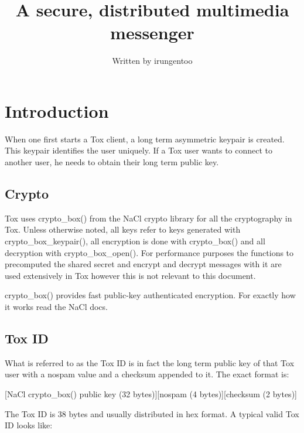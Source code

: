 \documentclass{tox}
\begin{document}
\title{A secure, distributed multimedia messenger}


\author{Written by irungentoo} %

\maketitle

\section{Introduction}

When one first starts a Tox client, a long term asymmetric keypair is created. 
This keypair identifies the user uniquely. If a Tox user wants to connect to 
another user, he needs to obtain their long term public key. 

\subsection{Crypto}

Tox uses crypto\_box() from the NaCl crypto library for all the cryptography in 
Tox. Unless otherwise noted, all keys refer to keys generated with 
crypto\_box\_keypair(), all encryption is done with crypto\_box() and all 
decryption with crypto\_box\_open(). For performance purposes the functions to 
precomputed the shared secret and encrypt and decrypt messages with it are used 
extensively in Tox however this is not relevant to this document.

crypto\_box() provides fast public-key authenticated encryption. For exactly 
how it works read the NaCl docs.

\subsection{Tox ID}

What is referred to as the Tox ID is in fact the long term public key of that 
Tox user with a nospam value and a checksum appended to it. The exact format is:

[NaCl crypto\_box() public key (32 bytes)][nospam (4 bytes)][checksum (2 bytes)]

The Tox ID is 38 bytes and usually distributed in hex format. A typical valid 
Tox ID looks like:
\end{document}
